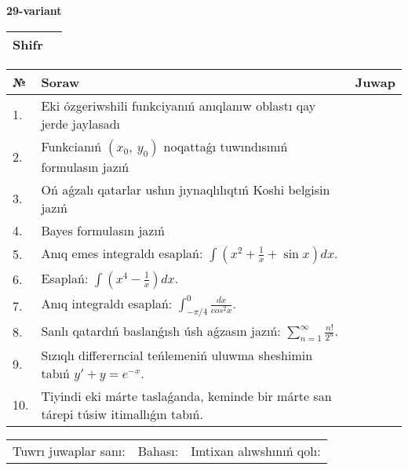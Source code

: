 \documentclass{article}
\begin{document}
  \egroup
  
  \newpage
  
  
  \textbf{29-variant}\\
  
  \bgroup
  \def\arraystretch{1.6} %
  
  \begin{tabular}{|m{5.7cm}|m{9.5cm}|}
  \hline
  Shifr & \\
  \hline
  \end{tabular}
  
  \vspace{1cm}
  
  \begin{tabular}{|m{0.7cm}|m{10cm}|m{4cm}|}
  \hline
  № & Soraw & Juwap \\
  \hline
  1. & Eki ózgeriwshili funkciyanıń anıqlanıw oblastı qay jerde jaylasadı &  \\
  \hline
  2. & Funkcianıń \((x_{0},\ y_{0})\) noqattaǵı tuwındısınıń formulasın jazıń &  \\
  \hline
  3. & Oń aǵzalı qatarlar ushın jıynaqlılıqtıń Koshi belgisin jazıń &  \\
  \hline
  4. & Bayes formulasın jazıń &  \\
  \hline
  5. & Anıq emes integraldı esaplań: \(\int{\left( x^2  + \frac{1}{x} + \sin x \right)dx}\). &  \\
  \hline
  6. & Esaplań: \(\int\left( x^{4} - \frac{1}{x} \right)dx\). &  \\
  \hline
  7. & Anıq integraldı esaplań: \(\int_{- \pi/4}^{0}\frac{dx}{cos^2 x}\). &  \\
  \hline
  8. & Sanlı qatardıń baslanǵısh úsh aǵzasın jazıń: \(\sum_{n = 1}^{\infty}\frac{n!}{2^{n}}\). &  \\
  \hline
  9. & Sızıqlı differerncial teńlemeniń uluwma sheshimin tabıń \(y' + y = e^{- x}\). &  \\
  \hline
  10. & Tiyindi eki márte taslaǵanda, keminde bir márte san tárepi túsiw itimallıǵın tabıń. &  \\
  \hline
  \end{tabular}
  
  \vspace{1cm}
  
  \begin{tabular}{lll}
  Tuwrı juwaplar sanı: \underline{\hspace{1.5cm}} & 
  Bahası: \underline{\hspace{1.5cm}} & 
  Imtixan alıwshınıń qolı: \underline{\hspace{2cm}} \\
  \end{tabular}
  
\end{document}
